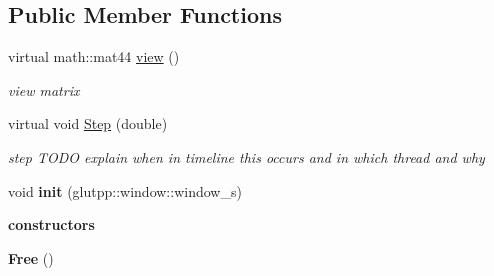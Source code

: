 \subsection*{\-Public \-Member \-Functions}
\begin{DoxyCompactItemize}
\item 
\hypertarget{classglutpp_1_1Camera_1_1View_1_1Free_adf7e996cecb8aa10c26811d6045cbd34}{virtual math\-::mat44 \hyperlink{classglutpp_1_1Camera_1_1View_1_1Free_adf7e996cecb8aa10c26811d6045cbd34}{view} ()}\label{classglutpp_1_1Camera_1_1View_1_1Free_adf7e996cecb8aa10c26811d6045cbd34}

\begin{DoxyCompactList}\small\item\em view matrix \end{DoxyCompactList}\item 
\hypertarget{classglutpp_1_1Camera_1_1View_1_1Free_a02e9f6a1a10c36751e09ded96dcd63a6}{virtual void \hyperlink{classglutpp_1_1Camera_1_1View_1_1Free_a02e9f6a1a10c36751e09ded96dcd63a6}{\-Step} (double)}\label{classglutpp_1_1Camera_1_1View_1_1Free_a02e9f6a1a10c36751e09ded96dcd63a6}

\begin{DoxyCompactList}\small\item\em step \-T\-O\-D\-O explain when in timeline this occurs and in which thread and why \end{DoxyCompactList}\item 
\hypertarget{classglutpp_1_1Camera_1_1View_1_1Free_a393fcaeafad6d09a4a6ec28800ac9706}{void {\bfseries init} (glutpp\-::window\-::window\-\_\-s)}\label{classglutpp_1_1Camera_1_1View_1_1Free_a393fcaeafad6d09a4a6ec28800ac9706}

\end{DoxyCompactItemize}
\begin{Indent}{\bf constructors}\par
\begin{DoxyCompactItemize}
\item 
\hypertarget{classglutpp_1_1Camera_1_1View_1_1Free_a3038c31e5a7a43d6dbf2d286e24d91c9}{{\bfseries \-Free} ()}\label{classglutpp_1_1Camera_1_1View_1_1Free_a3038c31e5a7a43d6dbf2d286e24d91c9}

\end{DoxyCompactItemize}
\end{Indent}
